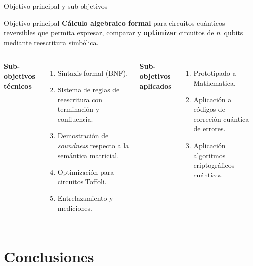 \documentclass[12pt, aspectratio=169]{beamer}
\begin{document}
\begin{frame}{Objetivo principal y sub-objetivos}
  \begin{block}{Objetivo principal}
    \small
    \textbf{Cálculo algebraico formal} para circuitos cuánticos
    reversibles que permita expresar, comparar y \textbf{optimizar}
    circuitos de $n$~qubits mediante reescritura simbólica.
  \end{block}

  \medskip
  \begin{columns}[T]
    \textbf{Sub-objetivos técnicos}
    \begin{enumerate}\small
      \item[\textbf{O1}] Sintaxis formal (BNF).
      \item[\textbf{O2}] Sistema de reglas de reescritura con terminación
            y confluencia.
      \item[\textbf{O3}] Demostración de \emph{soundness} respecto a la
            semántica matricial.
      \item[\textbf{O4}] Optimización para circuitos Toffoli.
      \item[\textbf{O5}] Entrelazamiento y mediciones.
    \end{enumerate}

    \textbf{Sub-objetivos aplicados}
    \begin{enumerate}\small
      \item[\textbf{O6}] Prototipado a Mathematica.
      \item[\textbf{O7}] Aplicación a códigos de correción cuántica de errores.
      \item[\textbf{O8}] Aplicación algoritmos criptográficos cuánticos.
    \end{enumerate}
  \end{columns}
\end{frame}


\section{Conclusiones}
\end{document}
